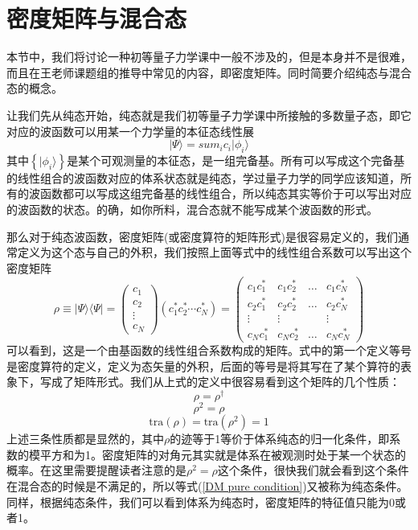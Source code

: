 \documentclass[12pt,a4paper,openany,twoside]{book}
\numberwithin{equation}{section}
\begin{document}
  \section{密度矩阵与混合态}
  \label{Density Matrix}
  本节中，我们将讨论一种初等量子力学课中一般不涉及的，但是本身并不是很难，而且在王老师课题组的推导中常见的内容，即密度矩阵。同时简要介绍纯态与混合态的概念。

  让我们先从纯态开始，纯态就是我们初等量子力学课中所接触的多数量子态，即它对应的波函数可以用某一个力学量的本征态线性展
  \begin{equation}
    | \Psi \rangle =sum_i c_{i} | \phi_i \rangle
  \end{equation}
  其中$\left\{ | \phi_i \rangle \right\}$是某个可观测量的本征态，是一组完备基。所有可以写成这个完备基的线性组合的波函数对应的体系状态就是纯态，学过量子力学的同学应该知道，所有的波函数都可以写成这组完备基的线性组合，所以纯态其实等价于可以写出对应的波函数的状态。的确，如你所料，混合态就不能写成某个波函数的形式。

  那么对于纯态波函数，密度矩阵(或密度算符的矩阵形式)是很容易定义的，我们通常定义为这个态与自己的外积，我们按照上面等式中的线性组合系数可以写出这个密度矩阵
  \begin{equation}
    \rho \equiv | \Psi \rangle \langle \Psi |=\left( \begin{array}{c}{c_{1}} \\ {c_{2}} \\ {\vdots} \\ {c_{N}}\end{array}\right)\left(c_{1}^{*} c_{2}^{*} \cdots c_{{N}}^{*}\right) =\left( \begin{array}{llll}{c_1 c_1^*} & {c_1 c_2^*}&{\dots}&{c_1c_N^*} \\ {c_2 c_1^*} & {c_2c_2^*}&{\dots}&{c_2c_N^*}\\{\vdots}&{\vdots}&{}&{\vdots}\\{c_Nc_1^*}&{c_Nc_2^*}&{\dots}&{c_Nc_N^*}\end{array}\right)
    \label{DM for pure state}
  \end{equation}
  可以看到，这是一个由基函数的线性组合系数构成的矩阵。式中的第一个定义等号是密度算符的定义，定义为态矢量的外积，后面的等号是将其写在了某个算符的表象下，写成了矩阵形式。我们从上式的定义中很容易看到这个矩阵的几个性质：
  \begin{equation}
    \rho = \rho ^{\dagger}
    \label{DM Hermite}
  \end{equation}
  \begin{equation}
    \rho^2 = \rho 
    \label{DM pure condition}
  \end{equation}
  \begin{equation}
    \text{tra}(\rho) = \text{tra}(\rho^2) =1 
    \label{DM properties for pure states}
  \end{equation}
  上述三条性质都是显然的，其中$\rho$的迹等于1等价于体系纯态的归一化条件，即系数的模平方和为1。密度矩阵的对角元其实就是体系在被观测时处于某一个状态的概率。在这里需要提醒读者注意的是$\rho^2 = \rho$这个条件，很快我们就会看到这个条件在混合态的时候是不满足的，所以等式(\ref{DM pure condition})又被称为纯态条件。同样，根据纯态条件，我们可以看到体系为纯态时，密度矩阵的特征值只能为0或者1。
\end{document}
